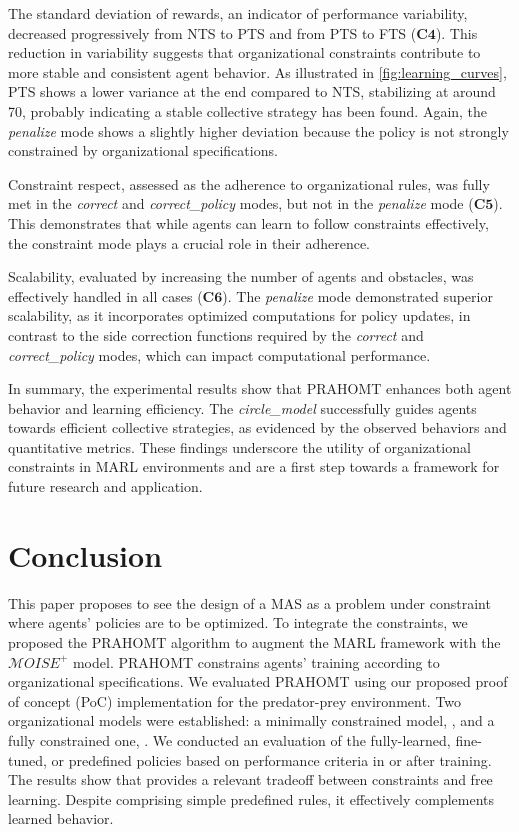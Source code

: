 \documentclass[sigconf,anonymous]{aamas}
\begin{document}
The standard deviation of rewards, an indicator of performance variability, decreased progressively from NTS to PTS and from PTS to FTS ($\mathbf{C4}$). This reduction in variability suggests that organizational constraints contribute to more stable and consistent agent behavior. As illustrated in \autoref{fig:learning_curves}, PTS shows a lower variance at the end compared to NTS, stabilizing at around 70, probably indicating a stable collective strategy has been found. Again, the \textit{penalize} mode shows a slightly higher deviation because the policy is not strongly constrained by organizational specifications.

Constraint respect, assessed as the adherence to organizational rules, was fully met in the \textit{correct} and \textit{correct\_policy} modes, but not in the \textit{penalize} mode ($\mathbf{C5}$). This demonstrates that while agents can learn to follow constraints effectively, the constraint mode plays a crucial role in their adherence.

Scalability, evaluated by increasing the number of agents and obstacles, was effectively handled in all cases ($\mathbf{C6}$). The \textit{penalize} mode demonstrated superior scalability, as it incorporates optimized computations for policy updates, in contrast to the side correction functions required by the \textit{correct} and \textit{correct\_policy} modes, which can impact computational performance.

In summary, the experimental results show that PRAHOMT enhances both agent behavior and learning efficiency. The \textit{circle\_model} successfully guides agents towards efficient collective strategies, as evidenced by the observed behaviors and quantitative metrics. These findings underscore the utility of organizational constraints in MARL environments and are a first step towards a framework for future research and application.



\section{Conclusion}\label{sec:conclusion}

This paper proposes to see the design of a MAS as a problem under constraint where agents' policies are to be optimized. To integrate the constraints, we proposed the PRAHOMT algorithm to augment the MARL framework with the $\mathcal{M}OISE^+$ model. PRAHOMT constrains agents' training according to organizational specifications. We evaluated PRAHOMT using our proposed proof of concept (PoC) implementation for the  predator-prey environment. Two organizational models were established: a minimally constrained model, , and a fully constrained one, . We conducted an evaluation of the fully-learned, fine-tuned, or predefined policies based on performance criteria in or after training.
%
The results show that  provides a relevant tradeoff between constraints and free learning. Despite comprising simple predefined rules, it effectively complements learned behavior.
\end{document}
